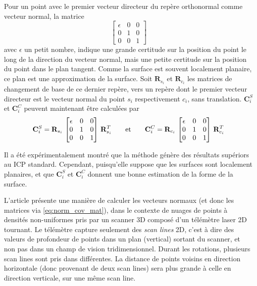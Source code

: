 \documentclass[a4paper,10pt]{scrreprt}
\begin{document}
Pour un point avec le premier vecteur directeur du repère orthonormal comme vecteur normal, la matrice
\begin{equation}
	\begin{bmatrix}
		\epsilon & 0 & 0 \\
		0 & 1 & 0 \\
		0 & 0 & 1
	\end{bmatrix}
\end{equation}
avec $\epsilon$ un petit nombre, indique une grande certitude sur la position du point le long de la direction du vecteur normal, mais une petite certitude sur la position du point dans le plan tangent. Comme la surface est souvent localement planaire, ce plan est une approximation de la surface. Soit $\mathbf{R}_{s_i}$ et $\mathbf{R}_{c_i}$ les matrices de changement de base de ce dernier repère, vers un repère dont le premier vecteur directeur est le vecteur normal du point $s_i$ respectivement $c_i$, sans translation. $\mathbf{C}^S_i$ et $\mathbf{C}^C_i$ peuvent maintenant être calculées par
\begin{equation} \label{eq:norm_cov_mat}
	\mathbf{C}^S_i = \mathbf{R}_{s_i} \, \begin{bmatrix}
		\epsilon & 0 & 0 \\
		0 & 1 & 0 \\
		0 & 0 & 1
	\end{bmatrix} \, \mathbf{R}_{s_i}^T
	\hspace{7mm} \text{et} \hspace{7mm}
	\mathbf{C}^C_i = \mathbf{R}_{c_i} \, \begin{bmatrix}
		\epsilon & 0 & 0 \\
		0 & 1 & 0 \\
		0 & 0 & 1
	\end{bmatrix} \, \mathbf{R}_{c_i}^T
\end{equation}

Il a été expérimentalement montré que la méthode génère des résultats supériors au ICP standard. \cite{Sega2009} Cependant, puisqu'elle suppose que les surfaces sont localement planaires, et que $\mathbf{C}^S_i$ et $\mathbf{C}^C_i$ donnent une bonne estimation de la forme de la surface.

L'article \cite{Holz2014} présente une manière de calculer les vecteurs normaux (et donc les matrices via \ref{eq:norm_cov_mat}), dans le contexte de nuages de points à densités non-uniformes pris par un scanner 3D composé d'un télémètre laser 2D tournant. Le télémètre capture seulement des \emph{scan lines} 2D, c'est à dire des valeurs de profondeur de points dans un plan (vertical) sortant du scanner, et non pas dans un champ de vision tridimensionnel. Durant les rotations, plusieurs scan lines sont pris dans différentes. La distance de points voisins en direction horizontale (donc provenant de deux scan lines) sera plus grande à celle en direction verticale, sur une même scan line.
\end{document}
